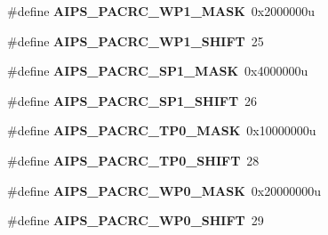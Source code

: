 \begin{DoxyCompactItemize}
\item 
\hypertarget{group___a_i_p_s___register___masks_ga4bb423c596ecb78c1e23d9954cc4fedd}{}\#define {\bfseries A\+I\+P\+S\+\_\+\+P\+A\+C\+R\+C\+\_\+\+W\+P1\+\_\+\+M\+A\+S\+K}~0x2000000u\label{group___a_i_p_s___register___masks_ga4bb423c596ecb78c1e23d9954cc4fedd}

\item 
\hypertarget{group___a_i_p_s___register___masks_ga48eccf183c93ef49d1ccc76ae947848d}{}\#define {\bfseries A\+I\+P\+S\+\_\+\+P\+A\+C\+R\+C\+\_\+\+W\+P1\+\_\+\+S\+H\+I\+F\+T}~25\label{group___a_i_p_s___register___masks_ga48eccf183c93ef49d1ccc76ae947848d}

\item 
\hypertarget{group___a_i_p_s___register___masks_ga0463369151b0ea0dbfe9046ca3f86d88}{}\#define {\bfseries A\+I\+P\+S\+\_\+\+P\+A\+C\+R\+C\+\_\+\+S\+P1\+\_\+\+M\+A\+S\+K}~0x4000000u\label{group___a_i_p_s___register___masks_ga0463369151b0ea0dbfe9046ca3f86d88}

\item 
\hypertarget{group___a_i_p_s___register___masks_ga98e4972b5f23d416e012c2726890e177}{}\#define {\bfseries A\+I\+P\+S\+\_\+\+P\+A\+C\+R\+C\+\_\+\+S\+P1\+\_\+\+S\+H\+I\+F\+T}~26\label{group___a_i_p_s___register___masks_ga98e4972b5f23d416e012c2726890e177}

\item 
\hypertarget{group___a_i_p_s___register___masks_gaee84972aa2f3c91842a560b8d4dbdf3e}{}\#define {\bfseries A\+I\+P\+S\+\_\+\+P\+A\+C\+R\+C\+\_\+\+T\+P0\+\_\+\+M\+A\+S\+K}~0x10000000u\label{group___a_i_p_s___register___masks_gaee84972aa2f3c91842a560b8d4dbdf3e}

\item 
\hypertarget{group___a_i_p_s___register___masks_gac6a87baabf4dccff778f7784d9c723d9}{}\#define {\bfseries A\+I\+P\+S\+\_\+\+P\+A\+C\+R\+C\+\_\+\+T\+P0\+\_\+\+S\+H\+I\+F\+T}~28\label{group___a_i_p_s___register___masks_gac6a87baabf4dccff778f7784d9c723d9}

\item 
\hypertarget{group___a_i_p_s___register___masks_ga88f5917b508d706482e80a4a0b2a35e5}{}\#define {\bfseries A\+I\+P\+S\+\_\+\+P\+A\+C\+R\+C\+\_\+\+W\+P0\+\_\+\+M\+A\+S\+K}~0x20000000u\label{group___a_i_p_s___register___masks_ga88f5917b508d706482e80a4a0b2a35e5}

\item 
\hypertarget{group___a_i_p_s___register___masks_ga29bde3efaa241ca6bf204175cd39fc1e}{}\#define {\bfseries A\+I\+P\+S\+\_\+\+P\+A\+C\+R\+C\+\_\+\+W\+P0\+\_\+\+S\+H\+I\+F\+T}~29\label{group___a_i_p_s___register___masks_ga29bde3efaa241ca6bf204175cd39fc1e}


\end{DoxyCompactItemize}
